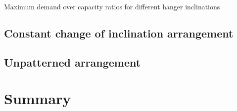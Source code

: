 \begin{table}[H]
    \centering
    \caption{Maximum demand over capacity ratios for different hanger inclinations}
    \label{tab:cost_inclination}
    
\end{table}


\subsection{Constant change of inclination arrangement}

\subsection{Unpatterned arrangement}



\section{Summary} \label{sec:res_summary}











